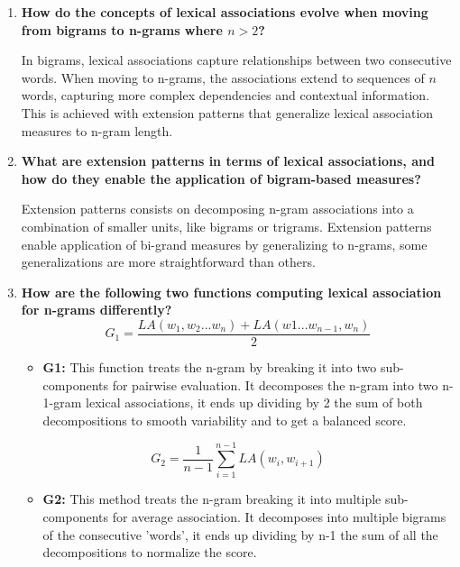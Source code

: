 \documentclass{article}
\begin{document}
\begin{enumerate}
    \item \textbf{How do the concepts of lexical associations evolve when moving from bigrams to n-grams where $ n > 2 $?}

    In bigrams, lexical associations capture relationships between two consecutive words. When moving to n-grams, the associations extend to sequences of $ n $ words, capturing more complex dependencies and contextual information. This is achieved with extension patterns that generalize lexical association measures to n-gram length.

    \item \textbf{What are extension patterns in terms of lexical associations, and how do they enable the application of bigram-based measures?}

    Extension patterns consists on decomposing n-gram associations into a combination of smaller units, like bigrams or trigrams. Extension patterns enable application of bi-grand measures by generalizing to n-grams, some generalizations are more straightforward than others.
  
    \item \textbf{How are the following two functions computing lexical association for n-grams differently?}
	\begin{equation*}
	G_1 = \frac{LA(w_1, w_2 ... w_n) + LA(w1 ... w_{n-1}, w_n)}{2}
	\end{equation*}
   	\begin{itemize}
        \item \textbf{G1:} This function treats the n-gram by breaking it into two sub-components for pairwise evaluation. It decomposes the n-gram into two n-1-gram lexical associations, it ends up dividing by 2 the sum of both decompositions to smooth variability and to get a balanced score.
    	\end{itemize}

	\begin{equation*}
	G_2 = \frac{1}{n - 1}\sum^{n-1}_{i=1}LA(w_i, w_{i+1})
	\end{equation*}
	\begin{itemize}
        \item \textbf{G2:} This method treats the n-gram breaking it into multiple sub-components for average association. It decomposes into multiple bigrams of the consecutive 'words', it ends up dividing by n-1 the sum of all the decompositions to normalize the score.
    \end{itemize}
\end{enumerate}
\end{document}
